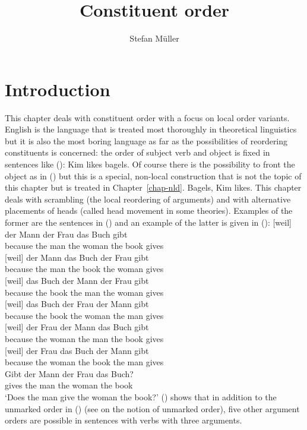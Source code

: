 \documentclass[output=paper]{langsci/langscibook}
\author{%
	Stefan Müller\affiliation{Humboldt-Universität zu Berlin}%
}
\title{Constituent order}
\begin{document}
\label{chap:constituents}

\section{Introduction} 

This chapter deals with constituent order with a focus on local order variants. English is the
language that is treated most thoroughly in theoretical linguistics but it is also the most boring
language as far as the possibilities of reordering constituents is concerned: the order of subject
verb and object is fixed in sentences like ():
\ea
Kim likes bagels.
\z
Of course there is the possibility to front the object as in () but this is a special,
non-local construction that is not the topic of this chapter but is treated in Chapter~\ref{chap-nld}.
\ea
Bagels, Kim likes.
\z
This chapter deals with scrambling (the local reordering of arguments) and with alternative
placements of heads (called head movement in some theories). Examples of the former are the
sentences in () and an example of the latter is given in ():
\eal
\label{ex-permutation-mf}
\ex 
\gll {}[weil]          der Mann der Frau das Buch gibt\\
     \spacebr{}because the man the woman the book gives\\
\ex 
\gll {}[weil]          der Mann das Buch der Frau  gibt\\
     \spacebr{}because the man  the book the woman gives\\
\ex 
\gll {}[weil]          das Buch der Mann der Frau  gibt\\
     \spacebr{}because the book the man  the woman gives\\
\ex 
\gll {}[weil]          das Buch der Frau  der Mann gibt\\
     \spacebr{}because the book the woman the man  gives\\
\ex 
\gll {}[weil]          der Frau  der Mann das Buch gibt\\
     \spacebr{}because the woman the man  the book gives\\
\ex 
\gll {}[weil]          der Frau  das Buch der Mann gibt\\
     \spacebr{}because the woman the book the man  gives\\
\zl
\ea
\gll Gibt der Mann der Frau das Buch?\\
     gives the man the woman the book\\
\glt `Does the man give the woman the book?'
\z
() shows that in addition to the unmarked order in () (see  on the
notion of unmarked order), five other argument orders are possible in sentences with verbs with
three arguments.
\end{document}
